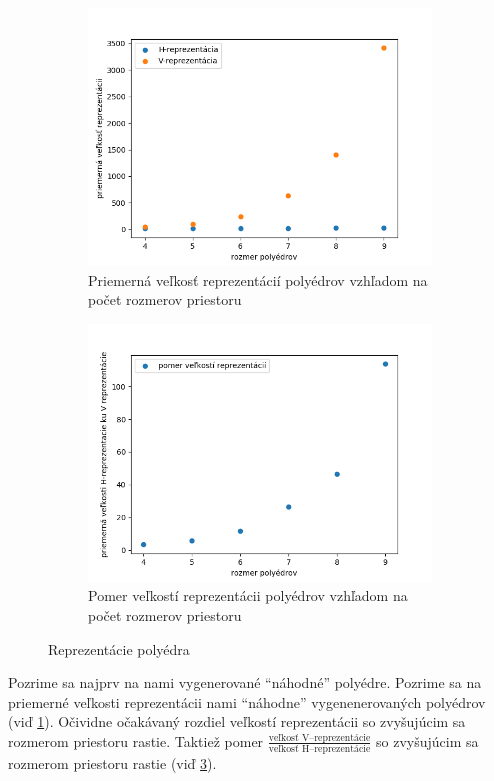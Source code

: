 \begin{figure}[H]
  \centering
  \begin{subfigure}[b]{\linewidth}
    \includegraphics[width=0.9\linewidth]{images/velkost_rep.png}
    \caption{Priemerná veľkosť reprezentácií polyédrov vzhľadom na počet rozmerov priestoru}
	\label{fig:velkost_rep}
  \end{subfigure}
  \begin{subfigure}[b]{\linewidth}
    \includegraphics[width=0.9\linewidth]{images/pomer_rep.png}
    \caption{Pomer veľkostí reprezentácii polyédrov vzhľadom na počet rozmerov priestoru}
	\label{fig:pomer_rep}
  \end{subfigure}
  \caption{Reprezentácie polyédra}
\end{figure}

Pozrime sa najprv na nami vygenerované ``náhodné'' polyédre. Pozrime sa na priemerné veľkosti reprezentácii nami ``náhodne'' vygenenerovaných polyédrov (viď \ref{fig:velkost_rep}). Očividne očakávaný rozdiel veľkostí reprezentácii so zvyšujúcim sa rozmerom priestoru rastie. Taktiež pomer $\frac{\text{veľkosť V--reprezentácie}}{\text{veľkosť H--reprezentácie}}$ so zvyšujúcim sa rozmerom priestoru rastie (viď \ref{fig:pomer_rep}).

